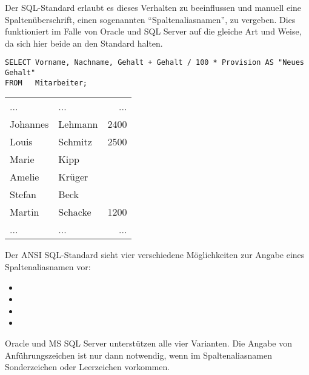         Der SQL-Standard erlaubt es dieses Verhalten zu beeinflussen und manuell eine Spaltenüberschrift, einen sogenannten \enquote{Spaltenaliasnamen}, zu vergeben. Dies funktioniert im Falle von Oracle und SQL Server auf die gleiche Art und Weise, da sich hier beide an den Standard halten.
        \begin{lstlisting}[language=oracle_sql,caption={Vergabe eines Spaltenaliasnamen},label=sql01_09]
SELECT Vorname, Nachname, Gehalt + Gehalt / 100 * Provision AS "Neues Gehalt"
FROM   Mitarbeiter;
        \end{lstlisting}
        \begin{center}
          \begin{small}
            \tablehead{}
            \begin{msoraclesql}
              \begin{supertabular}{llr}
                ... & ... & ... \\
                Johannes & Lehmann & 2400 \\
                Louis & Schmitz & 2500 \\
                Marie & Kipp &  \\
                Amelie & Krüger &  \\
                Stefan & Beck &  \\
                Martin & Schacke & 1200 \\
                ... & ... & ... \\
              \end{supertabular}
            \end{msoraclesql}
          \end{small}
        \end{center}
        Der ANSI SQL-Standard sieht vier verschiedene Möglichkeiten zur Angabe eines Spaltenaliasnamen vor:
        \begin{itemize}
          \item {}
          \item {}
          \item {}
          \item {}
        \end{itemize}
        Oracle und MS SQL Server unterstützen alle vier Varianten. Die Angabe von Anführungszeichen ist nur dann notwendig, wenn im Spaltenaliasnamen Sonderzeichen oder Leerzeichen vorkommen.


